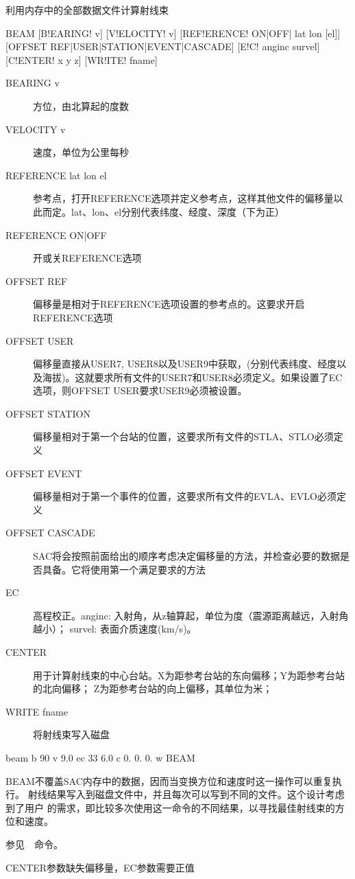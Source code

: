 \label{cmd:beam}

利用内存中的全部数据文件计算射线束

\begin{SACSTX}
BEAM [B!EARING! v] [V!ELOCITY! v] [REF!ERENCE! ON|OFF| lat lon [el]]
    [OFFSET REF|USER|STATION|EVENT|CASCADE] [E!C! anginc survel]
    [C!ENTER! x y z] [WR!ITE! fname]
\end{SACSTX}

\begin{description}
\item [BEARING v] 方位，由北算起的度数
\item [VELOCITY v] 速度，单位为公里每秒
\item [REFERENCE lat lon el] 参考点，打开REFERENCE选项并定义参考点，这样其他文件的偏移量以此而定。lat、lon、el分别代表纬度、经度、深度（下为正）
\item [REFERENCE ON|OFF] 开或关REFERENCE选项
\item [OFFSET REF] 偏移量是相对于REFERENCE选项设置的参考点的。这要求开启REFERENCE选项
\item [OFFSET USER] 偏移量直接从USER7, USER8以及USER9中获取，(分别代表纬度、经度以及海拔)。这就要求所有文件的USER7和USER8必须定义。如果设置了EC选项，则OFFSET USER要求USER9必须被设置。
\item [OFFSET STATION] 偏移量相对于第一个台站的位置，这要求所有文件的STLA、STLO必须定义
\item [OFFSET EVENT] 偏移量相对于第一个事件的位置，这要求所有文件的EVLA、EVLO必须定义
\item [OFFSET CASCADE] SAC将会按照前面给出的顺序考虑决定偏移量的方法，并检查必要的数据是否具备。它将使用第一个满足要求的方法
\item [EC] 高程校正。anginc: 入射角，从z轴算起，单位为度（震源距离越远，入射角越小）；
    survel: 表面介质速度(km/s)。
\item [CENTER] 用于计算射线束的中心台站。X为距参考台站的东向偏移；Y为距参考台站的北向偏移；
	Z为距参考台站的向上偏移，其单位为米；
\item [WRITE fname] 将射线束写入磁盘
\end{description}

\begin{SACDFT}
beam  b 90  v 9.0 ec 33  6.0 c  0. 0. 0. w BEAM
\end{SACDFT}

BEAM不覆盖SAC内存中的数据，因而当变换方位和速度时这一操作可以重复执行。
射线结果写入到磁盘文件中，并且每次可以写到不同的文件。这个设计考虑到了用户
的需求，即比较多次使用这一命令的不同结果，以寻找最佳射线束的方位和速度。

参见~~命令。

CENTER参数缺失偏移量，EC参数需要正值

